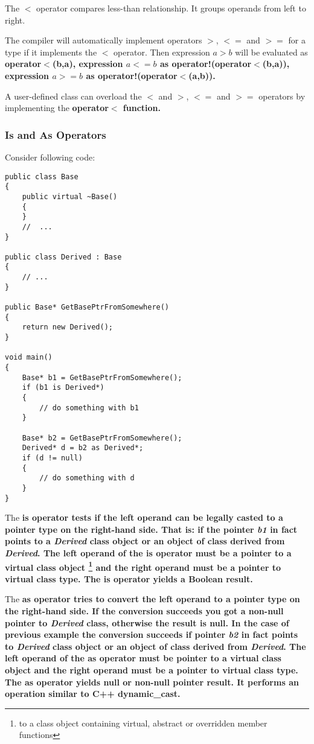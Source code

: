\documentclass[a4paper,oneside,11pt]{article}
\begin{document}
The $<$ operator compares less-than relationship. It groups operands from left to right.

The compiler will automatically implement operators $>$, $<=$ and $>=$ for a type if it implements the $<$ operator.
Then expression $a > b$ will be evaluated as \bf{operator$<$(b,a)},
expression $a <= b$ as \bf{operator!(operator$<$(b,a))},
expression $a >= b$ as \bf{operator!(operator$<$(a,b))}.

A user-defined class can overload the $<$ and $>$, $<=$ and $>=$ operators by implementing the \bf{operator$<$} function.

\subsubsection{\bf{Is} and \bf{As} Operators}

Consider following code:

\begin{lstlisting}[frame=trBL]
public class Base
{
    public virtual ~Base()
    {
    }
    //  ...
}

public class Derived : Base
{
    // ...
}

public Base* GetBasePtrFromSomewhere()
{
    return new Derived();
}

void main()
{
    Base* b1 = GetBasePtrFromSomewhere();
    if (b1 is Derived*)
    {
        // do something with b1
    }

    Base* b2 = GetBasePtrFromSomewhere();
    Derived* d = b2 as Derived*;
    if (d != null)
    {
        // do something with d
    }
}

\end{lstlisting}

The \bf{is} operator tests if the left operand can be legally casted to a pointer type on the right-hand side.
That is: if the pointer \emph{b1} in fact points to a \emph{Derived} class object or an object of class derived from \emph{Derived}.
The left operand of the \bf{is} operator must be a pointer to a virtual class object
\footnote{to a class object containing virtual, abstract or overridden member functions}
and the right operand must be a pointer to virtual class type. The \bf{is} operator yields a Boolean result.

The \bf{as} operator tries to convert the left operand to a pointer type on the right-hand side.
If the conversion succeeds you got a non-null pointer to \emph{Derived} class, otherwise the result is \bf{null}.
In the case of previous example the conversion succeeds if pointer \emph{b2} in fact points to \emph{Derived} class object or an object of class derived
from \emph{Derived}.
The left operand of the \bf{as} operator must be pointer to a virtual class object and the right operand must be a pointer to virtual class type.
The \bf{as} operator yields \bf{null} or non-null pointer result. It performs an operation similar to C++ \bf{dynamic\_cast}.
\end{document}

